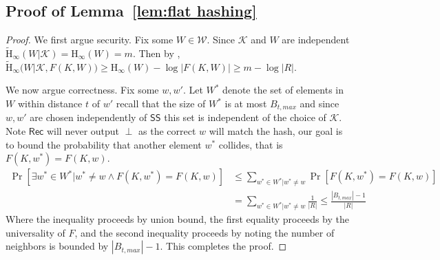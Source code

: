 \documentclass[11pt]{article}
\newcommand{\lemref}[1]{\mbox{Lemma~\ref{#1}}}
\newcommand{\class}[1]{{\ensuremath{\mathsf{#1}}}}
\newcommand{\sketch}{\ensuremath{\class{SS}}\xspace}
\newcommand{\rec}{\ensuremath{\class{Rec}}\xspace}
\newcommand{\Hoo}{\mathrm{H}_\infty}
\newcommand{\Hav}{\tilde{\mathrm{H}}_\infty}
\begin{document}
\subsection{Proof of \lemref{lem:flat hashing}}
\label{sec:proof of flat hashing}
\begin{proof}
We first argue security.  Fix some $W\in\mathcal{W}$. Since $\mathcal{K}$ and $W$ are independent $\Hav(W | \mathcal{K}) = \Hoo(W) = m$.  Then by \cite[Lemma 2.2b]{DBLP:journals/siamcomp/DodisORS08}, $\Hav(W | \mathcal{K}, F(K, W)) \ge \Hoo(W) - \log |F(K, W)| \ge m - \log |R|$.

We now argue correctness.  Fix some $w, w'$.  Let $W^*$ denote the set of elements in $W$ within distance $t$ of $w'$ recall that the size of $W^*$ is at most $B_{t, max}$ and since $w, w'$ are chosen independently of $\sketch$ this set is independent of the choice of $\mathcal{K}$.  Note $\rec$ will never output $\perp$ as the correct $w$ will match the hash, our goal is to bound the probability that another element $w^*$ collides, that is $F(K, w^*) = F(K, w)$.
\begin{align*}
\Pr[\exists w^* \in W^* |w^* \neq w \wedge F(K, w^*) = F(K, w)] &\le \sum_{w^*\in W^* | w^*\neq w} \Pr[F(K, w^*) = F(K, w)] \\
 &= \sum_{w^*\in W^* | w^*\neq w} \frac{1}{|R|} \le \frac{|B_{t, max}|-1}{|R|}
\end{align*}
Where the inequality proceeds by union bound, the first equality proceeds by the universality of $F$, and the second inequality proceeds by noting the number of neighbors is bounded by $|B_{t, max}|-1$.  This completes the proof.
\end{proof}
\end{document}
